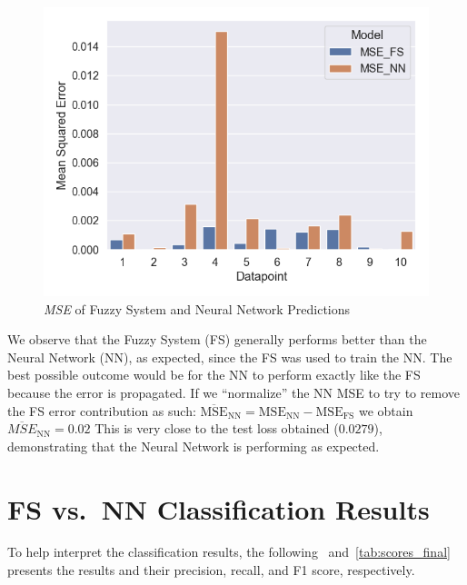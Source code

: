 \documentclass[titlepage]{article}
\begin{document}
\begin{figure}[H]
    \centering
    \includegraphics[scale=0.5]{../images/final_results/mse}
    \caption{\emph{MSE} of Fuzzy System and Neural Network Predictions}
    \label{fig:mse_fs_nn}
\end{figure}

We observe that the Fuzzy System (FS) generally performs better than the Neural Network (NN), as expected, since the FS was used to train the NN.
The best possible outcome would be for the NN to perform exactly like the FS because the error is propagated.
If we ``normalize'' the NN MSE to try to remove the FS error contribution as such: $\overline{\text{MSE}}_{\text{NN}}=\text{MSE}_{\text{NN}} - \text{MSE}_{\text{FS}}$
we obtain $\overline{MSE}_{\text{NN}}=0.02$ This is very close to the test loss obtained ($0.0279$), demonstrating that the Neural Network is performing as expected.

\section{FS vs.\ NN Classification Results}
To help interpret the classification results, the following~ and~\cref{tab:scores_final} presents the results and their precision, recall, and F1 score, respectively.
\end{document}
